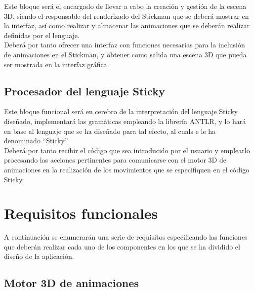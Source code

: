 \documentclass[11pt,a4paper]{report}
\begin{document}
Este bloque será el encargado de llevar a cabo la creación y gestión de la escena 3D, siendo el responsable del renderizado del Stickman que se deberá mostrar en la interfaz, así como realizar y almacenar las animaciones que se deberán realizar definidas por el lenguaje. \\

Deberá por tanto ofrecer una interfaz con funciones necesarias para la inclusión de animaciones en el Stickman, y obtener como salida una escena 3D que pueda ser mostrada en la interfaz gráfica. \\

\subsection{Procesador del lenguaje Sticky}
\label{sec-1.1.2}


Este bloque funcional será en cerebro de la interpretación del lenguaje Sticky diseñado, implementará las gramáticas empleando la librería ANTLR, y lo hará en base al lenguaje que se ha diseñado para tal efecto, al cuals e le ha denominado ``Sticky''.\\

Deberá por tanto recibir el código que sea introducido por el usuario y emplearlo procesando las acciones pertinentes para comunicarse con el motor 3D de animaciones en la realización de los movimientos que se especifiquen en el código Sticky. \\

\section{Requisitos funcionales}
\label{sec-1.2}


A continuación se enumerarán una serie de requisitos especificando las funciones que deberán realizar cada uno de los componentes en los que se ha dividido el diseño de la aplicación. \\

\subsection{Motor 3D de animaciones}
\label{sec-1.2.1}
\end{document}
